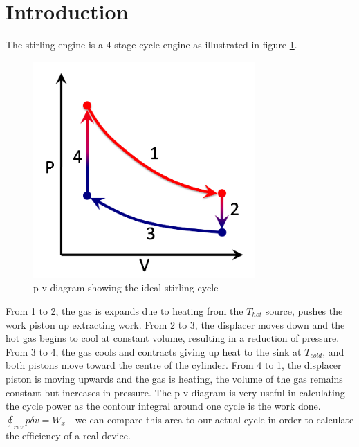 \documentclass[12pt]{article}
\begin{document}
    \section{Introduction}
        The stirling engine is a 4 stage cycle engine as illustrated in figure \ref{stirlingcycle}.
        \begin{figure}[H]
            \captionsetup{labelfont=bf}
            \includegraphics[width=20pc]{stirlingcycle.png}
            \caption{p-v diagram showing the ideal stirling cycle}\label{stirlingcycle}
        \end{figure}
        From 1 to 2, the gas is expands due to heating from the $T_{hot}$ source, pushes the work piston up extracting work. From 2 to 3, the displacer moves down and the hot gas
        begins to cool at constant volume, resulting in a reduction of pressure. From 3 to 4, the gas cools and contracts giving up heat to the sink at $T_{cold}$, and both pistons
        move toward the centre of the cylinder. From 4 to 1, the displacer piston is moving upwards and the gas is heating, the volume of the gas remains constant but increases in pressure.
        The p-v diagram is very useful in calculating the cycle power as the contour integral around one cycle is the work done. $\oint_{rev}p \delta v = W_x$ - we can compare this area 
        to our actual cycle in order to calculate the efficiency of a real device.
\end{document}
